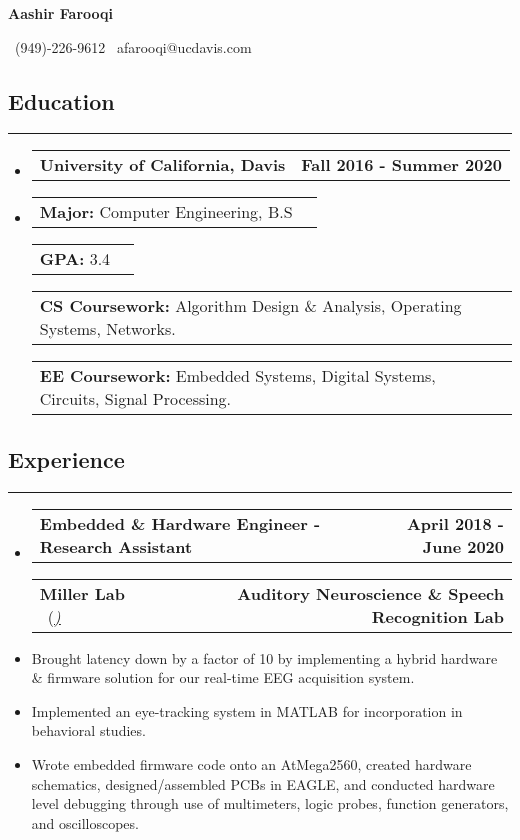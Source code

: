 \documentclass[10pt,letterpaper]{article}
\makeatletter
\newcommand{\items}[2]
{
	\begin{tabular*}{\linewidth}{l @{\extracolsep{\fill}} r}
		#1 & #2 \\
	\end{tabular*}
}
\newcommand{\header}[2]
{
	\begin{tabular*}{\linewidth}{l @{\extracolsep{\fill}} r}
		\hspace{-27pt} #1 & #2 \\
	\end{tabular*}
}
\newcommand{\sectionbreak}
{
	\vspace{-1.2em}
	\rule{\textwidth}{1.7pt}
	\vspace{-1.7em}
}
\makeatother
\begin{document}
\begin{center}
{\LARGE \textbf{Aashir Farooqi}}

\vspace{0.5em}
\ (949)-226-9612 \textbar 
\ afarooqi@ucdavis.com \textbar
\ \href{https://github.com/AashPointO}{\emph{\underline{}}}
\\
\end{center}
\vspace{-20pt}


\subsection*{Education}
\sectionbreak

\begin{itemize}

\item[] 
	\header
		{\textbf{University of California, Davis}}
		{\textbf{Fall 2016 - Summer 2020}}
\item[]
	\vspace{-2.5pt}
	\items
		{\textbf{Major:} Computer Engineering, B.S}
		{}
	\items
		{\textbf{GPA:} 3.4}
		{}
	\items
		{\textbf{CS Coursework:} Algorithm Design \& Analysis, Operating Systems, Networks.}
		{}
	\items
		{\textbf{EE Coursework:} Embedded Systems, Digital Systems, Circuits, Signal Processing.}
		{}
{\vspace{-0.6em}}
	
\end{itemize}

\vspace{-24.65pt}

\subsection*{Experience}
\sectionbreak

\begin{itemize}
	\item[]
		\header
			{\textbf{Embedded \& Hardware Engineer - Research Assistant}} 
			{\textbf{April 2018 - June 2020}}
		\header
		{\textbf{Miller Lab} \ (\href{https://millerlab.faculty.ucdavis.edu}{\small \emph{\underline{\smash{millerlab.faculty.ucdavis.edu})}}} }
			{\textbf{Auditory Neuroscience \& Speech Recognition Lab}} 
		\item
			Brought latency down by a factor of 10 by implementing a hybrid hardware \& firmware solution for our real-time EEG acquisition system.
		\item 
			Implemented an eye-tracking system in MATLAB for incorporation in behavioral studies.
		\item 
			Wrote embedded firmware code onto an AtMega2560, created hardware schematics, designed/assembled PCBs in EAGLE, and conducted hardware level debugging through use
			of multimeters, logic probes, function generators, and oscilloscopes.
\end{itemize}
\end{document}
